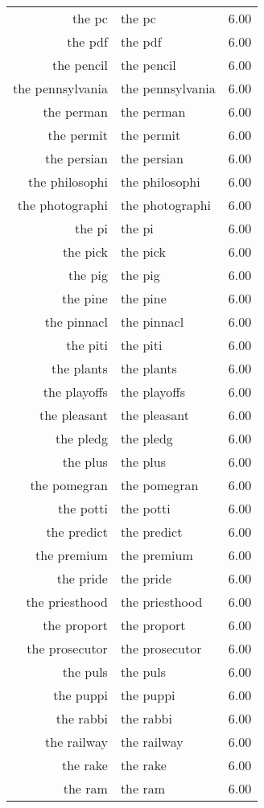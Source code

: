 \begin{table}[ht]
\begin{tabular}{rlr}
  the pc & the pc & 6.00 \\ 
  the pdf & the pdf & 6.00 \\ 
  the pencil & the pencil & 6.00 \\ 
  the pennsylvania & the pennsylvania & 6.00 \\ 
  the perman & the perman & 6.00 \\ 
  the permit & the permit & 6.00 \\ 
  the persian & the persian & 6.00 \\ 
  the philosophi & the philosophi & 6.00 \\ 
  the photographi & the photographi & 6.00 \\ 
  the pi & the pi & 6.00 \\ 
  the pick & the pick & 6.00 \\ 
  the pig & the pig & 6.00 \\ 
  the pine & the pine & 6.00 \\ 
  the pinnacl & the pinnacl & 6.00 \\ 
  the piti & the piti & 6.00 \\ 
  the plants & the plants & 6.00 \\ 
  the playoffs & the playoffs & 6.00 \\ 
  the pleasant & the pleasant & 6.00 \\ 
  the pledg & the pledg & 6.00 \\ 
  the plus & the plus & 6.00 \\ 
  the pomegran & the pomegran & 6.00 \\ 
  the potti & the potti & 6.00 \\ 
  the predict & the predict & 6.00 \\ 
  the premium & the premium & 6.00 \\ 
  the pride & the pride & 6.00 \\ 
  the priesthood & the priesthood & 6.00 \\ 
  the proport & the proport & 6.00 \\ 
  the prosecutor & the prosecutor & 6.00 \\ 
  the puls & the puls & 6.00 \\ 
  the puppi & the puppi & 6.00 \\ 
  the rabbi & the rabbi & 6.00 \\ 
  the railway & the railway & 6.00 \\ 
  the rake & the rake & 6.00 \\ 
  the ram & the ram & 6.00 \\ 

\end{tabular}
\end{table}
